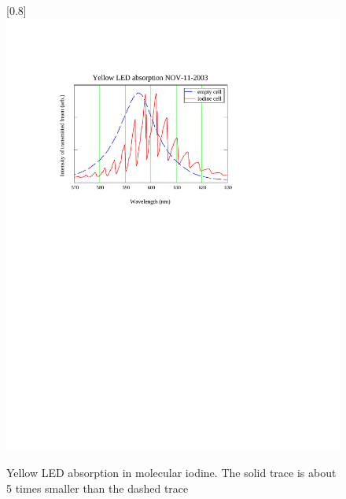 \begin{figure}
\scalebox{0.8}[0.8]{
\includegraphics[bb=0 450 489 700]
{yellowLED/yellowLED.pdf}
}
\caption[Yellow LED absorption in molecular iodine]{Yellow LED absorption in molecular iodine. The solid trace is about 5 times smaller than the dashed trace}
\label{yellowLED}
\end{figure}
